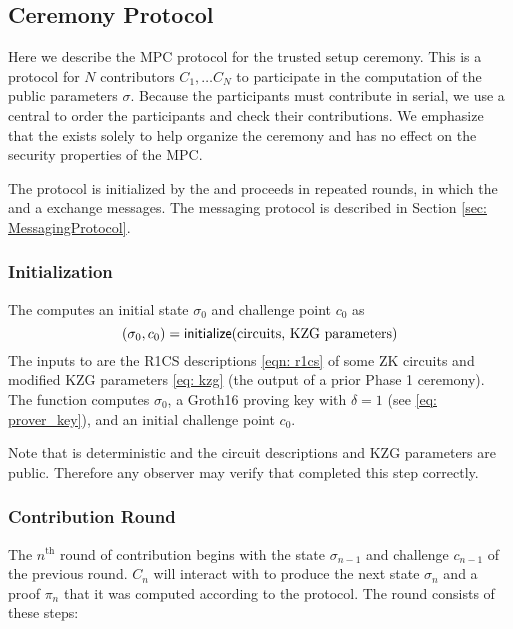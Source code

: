 \subsection{Ceremony Protocol}

Here we describe the MPC protocol for the trusted setup ceremony. This is a protocol for $N$ contributors $C_1, \ldots C_N$ to participate in the computation of the public parameters $\sigma$. Because the participants must contribute in serial, we use a central \Coordinator{} to order the participants and check their contributions. We emphasize that the \Coordinator{} exists solely to help organize the ceremony and has no effect on the security properties of the MPC.

The protocol is initialized by the \Coordinator{} and proceeds in repeated rounds, in which the \Coordinator{} and a \Contributor{} exchange messages. The messaging protocol is described in Section \ref{sec: MessagingProtocol}.

\subsubsection*{Initialization}

The \Coordinator{} computes an initial state $\sigma_0$ and challenge point $c_0$ as 
\begin{equation*}
    (\sigma_0, c_0) =  {\textsf{initialize}}{}(\text{circuits, KZG parameters})
\end{equation*} 
The inputs to \initialize{} are the R1CS descriptions \eqref{eqn: r1cs} of some ZK circuits and modified KZG parameters \eqref{eq: kzg} (the output of a prior Phase 1 ceremony). The function \initialize{} computes $\sigma_0$, a Groth16 proving key with $\delta = 1$ (see \eqref{eq: prover_key}), and an initial challenge point $c_0$.

Note that \initialize{} is deterministic and the circuit descriptions and KZG parameters are public. Therefore any observer may verify that \Coordinator{} completed this step correctly.

\subsubsection*{Contribution Round}

The $n^{\text{th}}$ round of contribution begins with the state $\sigma_{n-1}$ and challenge $c_{n-1}$ of the previous round. \Contributor{} $C_n$ will interact with \Coordinator{} to produce the next state $\sigma_{n}$ and a proof $\pi_{n}$ that it was computed according to the protocol. The round consists of these steps:

